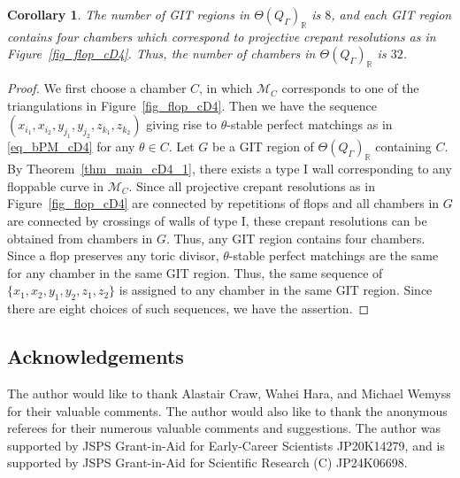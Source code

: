 \documentclass[pdftex]{sigma}
\numberwithin{equation}{section}
\newtheorem{Corollary}[Theorem]{Corollary}
\theoremstyle{definition}
\newcommand{\RR}{\mathbb{R}}
\newcommand{\calM}{\mathcal{M}}
\begin{document}
\begin{Corollary}
The number of GIT regions in $\Theta(Q_\Gamma)_\RR$ is $8$, and each GIT region contains four chambers which correspond to projective crepant resolutions as in {\rm Figure~\ref{fig_flop_cD4}}. Thus, the number of chambers in $\Theta(Q_\Gamma)_\RR$ is $32$.
\end{Corollary}

\begin{proof}
We first choose a chamber $C$, in which $\calM_C$ corresponds to one of the triangulations in Figure~\ref{fig_flop_cD4}.
Then we have the sequence $(x_{i_1}, x_{i_2}, y_{j_1}, y_{j_2}, z_{k_1}, z_{k_2})$ giving rise to $\theta$-stable perfect matchings as in \eqref{eq_bPM_cD4} for any $\theta\in C$.
Let $G$ be a GIT region of $\Theta(Q_\Gamma)_\RR$ containing $C$.
By Theorem~\ref{thm_main_cD4_1}, there exists a type I wall corresponding to any floppable curve in $\calM_C$.
Since all projective crepant resolutions as in Figure~\ref{fig_flop_cD4} are connected by repetitions of flops
and all chambers in $G$ are connected by crossings of walls of type I, these crepant resolutions can be obtained from chambers in $G$.
Thus, any GIT region contains four chambers.
Since a flop preserves any toric divisor, $\theta$-stable perfect matchings are the same for any chamber in the same GIT region.
Thus, the same sequence of $\{x_1, x_2, y_1, y_2, z_1, z_2\}$ is assigned to any chamber in the same GIT region.
Since there are eight choices of such sequences, we have the assertion.
\end{proof}


\subsection*{Acknowledgements}
The author would like to thank Alastair Craw, Wahei Hara, and Michael Wemyss for their valuable comments.
The author would also like to thank the anonymous referees for their numerous valuable comments and suggestions.
The author was supported by JSPS Grant-in-Aid for Early-Career Scientists JP20K14279,
and is supported by JSPS Grant-in-Aid for Scientific Research (C) JP24K06698.
\end{document}
